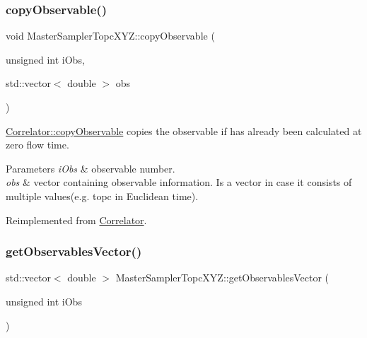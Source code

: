 \subsubsection{\texorpdfstring{copyObservable()}{copyObservable()}}
{\footnotesize\ttfamily void Master\+Sampler\+Topc\+X\+Y\+Z\+::copy\+Observable (\begin{DoxyParamCaption}\item[{unsigned int}]{i\+Obs,  }\item[{std\+::vector$<$ double $>$}]{obs }\end{DoxyParamCaption})\hspace{0.3cm}{\ttfamily [virtual]}}



\mbox{\hyperlink{class_correlator_ac780d8b180294ee4801ede6e6a13f7f4}{Correlator\+::copy\+Observable}} copies the observable if has already been calculated at zero flow time. 


\begin{DoxyParams}{Parameters}
{\em i\+Obs} & observable number. \\
\hline
{\em obs} & vector containing observable information. Is a vector in case it consists of multiple values(e.\+g. topc in Euclidean time). \\
\hline
\end{DoxyParams}


Reimplemented from \mbox{\hyperlink{class_correlator_ac780d8b180294ee4801ede6e6a13f7f4}{Correlator}}.

\mbox{\label{class_master_sampler_topc_x_y_z_a1a922db23320ff46f8f736788c6977bb}} 
\subsubsection{\texorpdfstring{getObservablesVector()}{getObservablesVector()}}
{\footnotesize\ttfamily std\+::vector$<$ double $>$ Master\+Sampler\+Topc\+X\+Y\+Z\+::get\+Observables\+Vector (\begin{DoxyParamCaption}\item[{unsigned int}]{i\+Obs }\end{DoxyParamCaption})\hspace{0.3cm}{\ttfamily [virtual]}}



